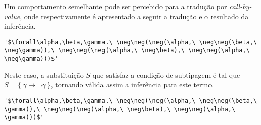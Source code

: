 Um comportamento semelhante pode ser percebido para a tradução por \textit{call-by-value}, onde respectivamente é apresentado a seguir a tradução e o resultado da inferência.
\lstset{extendedchars=false, escapeinside=''}
\begin{lstlisting}[style=output,caption={Tradução em CBV do tipo do combinador S}]
  '$\forall\alpha,\beta,\gamma.\ \neg\neg(\neg(\alpha,\ \neg\neg(\beta,\ \neg\gamma)),\ \neg\neg(\neg(\alpha,\ \neg\beta),\ \neg\neg(\alpha,\ \neg\gamma)))$'
\end{lstlisting}
Neste caso, a substituição $S$ que satisfaz a condição de subtipagem é tal que $S = \{\ \gamma \mapsto \neg\gamma\ \}$, tornando válida assim a inferência para este termo.
\lstset{extendedchars=false, escapeinside=''}
\begin{lstlisting}[style=output,caption={Inferência do tipo do combinador S traduzido em CBV}]
  '$\forall\alpha,\beta,\gamma.\ \neg\neg(\neg(\alpha,\ \neg\neg(\beta,\ \gamma)),\ \neg\neg(\neg(\alpha,\ \neg\beta),\ \neg\neg(\alpha,\ \gamma)))$'
\end{lstlisting}

